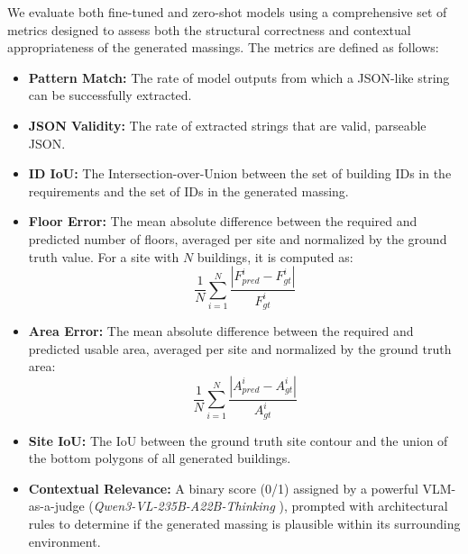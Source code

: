 \begin{table}[t]
\begin{tabular}{m{2cm} m{2cm} m{2cm} | m{2cm} m{2cm} m{2cm} | m{2cm}}
        \bottomrule
    \end{tabular}
\end{table}

We evaluate both fine-tuned and zero-shot models using a comprehensive set of metrics designed to assess both the structural correctness and contextual appropriateness of the generated massings. The metrics are defined as follows:

\begin{itemize}
    \item \textbf{Pattern Match:} The rate of model outputs from which a JSON-like string can be successfully extracted.
    \item \textbf{JSON Validity:} The rate of extracted strings that are valid, parseable JSON.
    \item \textbf{ID IoU:} The Intersection-over-Union between the set of building IDs in the requirements and the set of IDs in the generated massing.
    \item \textbf{Floor Error:} The mean absolute difference between the required and predicted number of floors, averaged per site and normalized by the ground truth value. For a site with \(N\) buildings, it is computed as:
    \begin{equation}
        \frac{1}{N} \sum_{i=1}^{N} \frac{|F_{pred}^i - F_{gt}^i|}{F_{gt}^i}
        \label{eq:floor_error}
    \end{equation}
    \item \textbf{Area Error:} The mean absolute difference between the required and predicted usable area, averaged per site and normalized by the ground truth area:
    \begin{equation}
        \frac{1}{N} \sum_{i=1}^{N} \frac{|A_{pred}^i - A_{gt}^i|}{A_{gt}^i}
        \label{eq:area_error}
    \end{equation}
    \item \textbf{Site IoU:} The IoU between the ground truth site contour and the union of the bottom polygons of all generated buildings.
    \item \textbf{Contextual Relevance:} A binary score (0/1) assigned by a powerful VLM-as-a-judge (\textit{Qwen3-VL-235B-A22B-Thinking} \cite{qwen_think}), prompted with architectural rules to determine if the generated massing is plausible within its surrounding environment.
\end{itemize}


